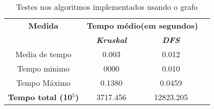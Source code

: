 \documentclass[12pt]{article}
\begin{document}
  \begin{table}[htbp]
    \caption{Testes nos algoritmos implementados usando o grafo }
    \begin{center}
    \begin{tabular}{|c|c|c|c|}
      \hline
      \textbf{Medida}&\multicolumn{2}{|c|}{\textbf{Tempo médio(em segundos)}} \\
      \cline{2-3} 
      \textbf{} & \textbf{\textit{Kruskal}}& \textbf{\textit{DFS}} \\
      \hline
      Media de tempo& 0.003 & 0.012 \\
      \hline
      Tempo minimo& 0000 & 0.010 \\
      \hline
      Tempo Máximo&  0.1380 & 0.0459 \\
      \hline
      \textbf{Tempo total (10$^{\mathrm{5}}$)} & 3717.456 & 12823.205 \\
      \hline
    \end{tabular}
    \end{center}
  \end{table}
  \newpage
\end{document}
